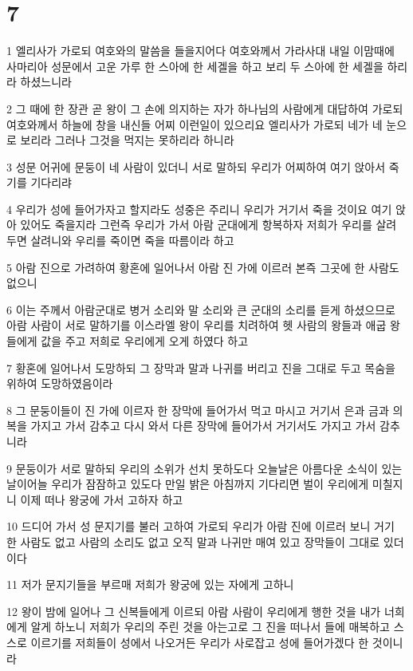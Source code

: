 \chapter{7}

\par 1 엘리사가 가로되 여호와의 말씀을 들을지어다 여호와께서 가라사대 내일 이맘때에 사마리아 성문에서 고운 가루 한 스아에 한 세겔을 하고 보리 두 스아에 한 세겔을 하리라 하셨느니라
\par 2 그 때에 한 장관 곧 왕이 그 손에 의지하는 자가 하나님의 사람에게 대답하여 가로되 여호와께서 하늘에 창을 내신들 어찌 이런일이 있으리요 엘리사가 가로되 네가 네 눈으로 보리라 그러나 그것을 먹지는 못하리라 하니라
\par 3 성문 어귀에 문둥이 네 사람이 있더니 서로 말하되 우리가 어찌하여 여기 앉아서 죽기를 기다리랴
\par 4 우리가 성에 들어가자고 할지라도 성중은 주리니 우리가 거기서 죽을 것이요 여기 앉아 있어도 죽을지라 그런즉 우리가 가서 아람 군대에게 항복하자 저희가 우리를 살려 두면 살려니와 우리를 죽이면 죽을 따름이라 하고
\par 5 아람 진으로 가려하여 황혼에 일어나서 아람 진 가에 이르러 본즉 그곳에 한 사람도 없으니
\par 6 이는 주께서 아람군대로 병거 소리와 말 소리와 큰 군대의 소리를 듣게 하셨으므로 아람 사람이 서로 말하기를 이스라엘 왕이 우리를 치려하여 헷 사람의 왕들과 애굽 왕들에게 값을 주고 저희로 우리에게 오게 하였다 하고
\par 7 황혼에 일어나서 도망하되 그 장막과 말과 나귀를 버리고 진을 그대로 두고 목숨을 위하여 도망하였음이라
\par 8 그 문둥이들이 진 가에 이르자 한 장막에 들어가서 먹고 마시고 거기서 은과 금과 의복을 가지고 가서 감추고 다시 와서 다른 장막에 들어가서 거기서도 가지고 가서 감추니라
\par 9 문둥이가 서로 말하되 우리의 소위가 선치 못하도다 오늘날은 아름다운 소식이 있는 날이어늘 우리가 잠잠하고 있도다 만일 밝은 아침까지 기다리면 벌이 우리에게 미칠지니 이제 떠나 왕궁에 가서 고하자 하고
\par 10 드디어 가서 성 문지기를 불러 고하여 가로되 우리가 아람 진에 이르러 보니 거기 한 사람도 없고 사람의 소리도 없고 오직 말과 나귀만 매여 있고 장막들이 그대로 있더이다
\par 11 저가 문지기들을 부르매 저희가 왕궁에 있는 자에게 고하니
\par 12 왕이 밤에 일어나 그 신복들에게 이르되 아람 사람이 우리에게 행한 것을 내가 너희에게 알게 하노니 저희가 우리의 주린 것을 아는고로 그 진을 떠나서 들에 매복하고 스스로 이르기를 저희들이 성에서 나오거든 우리가 사로잡고 성에 들어가겠다 한 것이니라
